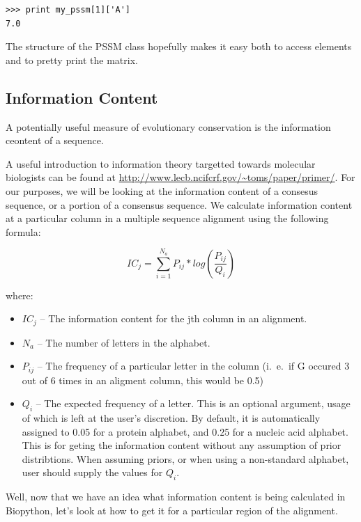 \documentclass{report}
\begin{document}
\begin{verbatim}
>>> print my_pssm[1]['A']
7.0
\end{verbatim}

The structure of the PSSM class hopefully makes it easy both to access elements and to pretty print the matrix.

\subsection{Information Content}
\label{sec:getting_info_content}

A potentially useful measure of evolutionary conservation is the information ceontent of a sequence.


A useful introduction to information theory targetted towards molecular biologists can be found at \url{http://www.lecb.ncifcrf.gov/~toms/paper/primer/}. For our purposes, we will be looking at the information content of a consesus sequence, or a portion of a consensus sequence. We calculate information content at a particular column in a multiple sequence alignment using the following formula:

\begin{displaymath}
IC_{j} = \sum_{i=1}^{N_{a}} P_{ij} * log(\frac{P_{ij}}{Q_{i}}) 
\end{displaymath}

where:

\begin{itemize}
  \item $IC_{j}$ -- The information content for the jth column in an alignment.
  \item $N_{a}$ -- The number of letters in the alphabet.
  \item $P_{ij}$ -- The frequency of a particular letter in the column (i.~e.~if G occured 3 out of 6 times in an aligment column, this would be 0.5)
  \item $Q_{i}$ --  The expected frequency of a letter. This is an
  optional argument, usage of which is left at the user's
  discretion. By default, it is automatically assigned to 0.05 for a
  protein alphabet, and 0.25 for a nucleic acid alphabet. This is for
  geting the information content without any assumption of prior
  distribtions. When assuming priors, or when using a non-standard
  alphabet, user should supply the values for $Q_{i}$. 
\end{itemize}

Well, now that we have an idea what information content is being calculated in Biopython, let's look at how to get it for a particular region of the alignment.
\end{document}
